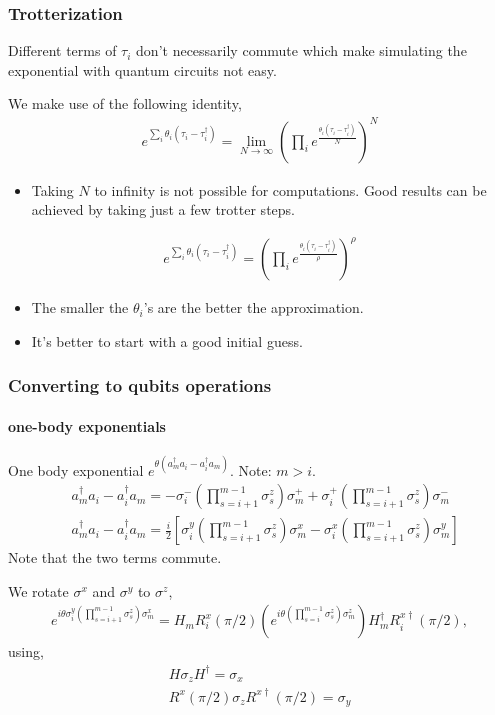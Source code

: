 \documentclass{beamer}
\renewcommand{\(}{\left(}
\renewcommand{\)}{\right)}
\renewcommand{\[}{\left[}
\renewcommand{\]}{\right]}
\begin{document}
\begin{frame}
    \frametitle{Trotterization}
    Different terms of $\tau_i$ don't necessarily commute which make simulating the exponential with quantum circuits not easy. 

    We make use of the following identity,
    \begin{align*}
        e^{\sum_i \theta_i (\tau_i - \tau^\dagger_i)} = \lim_{N \rightarrow \infty}\(\prod_i e^{\frac{\theta_i (\tau_i - \tau_i^\dagger)}{N}}\)^N
    \end{align*}
    \pause
    \begin{itemize}
        \item Taking $N$ to infinity is not possible for computations. Good results can be achieved by taking just a few trotter steps.
    \end{itemize}
    \begin{align*}
        e^{\sum_i \theta_i (\tau_i - \tau^\dagger_i)} = \(\prod_i e^{\frac{\theta_i (\tau_i - \tau_i^\dagger)}{\rho}}\)^\rho
    \end{align*}
    \begin{itemize}
        \item The smaller the $\theta_i$'s are the better the approximation.
        \item It's better to start with a good initial guess. 
    \end{itemize}
    
\end{frame}

\begin{frame}
    \frametitle{Converting to qubits operations}
    \framesubtitle{one-body exponentials}

    One body exponential $e^{\theta (a^\dagger_m a_i - a^\dagger_i a_m )}$. Note: $m>i.$ 
    \begin{align*}
        &a^\dagger_m a_i - a^\dagger_i a_m = -\sigma^{-}_i \(\prod_{s=i+1}^{m-1} \sigma_s^z\) \sigma^{+}_m  + \sigma^{+}_i  \(\prod_{s=i+1}^{m-1} \sigma_s^z\) \sigma^{-}_m \\
        &a^\dagger_m a_i - a^\dagger_i a_m = \frac{i}{2} \[ \sigma^{y}_i \(\prod_{s=i+1}^{m-1} \sigma_s^z\) \sigma^{x}_m  - \sigma^{x}_i \(\prod_{s=i+1}^{m-1} \sigma_s^z\) \sigma^{y}_m \]
    \end{align*}
    Note that the two terms commute. 
    \pause

    We rotate $\sigma^x$ and $\sigma^y$ to $\sigma^{z}$,
    \begin{align*}
        e^{i\theta \sigma^{y}_i \(\prod_{s=i+1}^{m-1} \sigma_s^z\) \sigma^{x}_m}  = H_m R^x_i(\pi/2)\(e^{i\theta \(\prod_{s=i}^{m-1} \sigma_s^z\) \sigma^{z}_m } \)H^\dagger_m R^{x\dagger}_i(\pi/2), 
    \end{align*}
    using,
    \begin{gather*}
        H \sigma_z H^\dagger  = \sigma_x \\ 
        R^x\(\pi/2\) \sigma_z R^{x\dagger}\(\pi/2\)  = \sigma_y 
    \end{gather*}
\end{frame}
\end{document}
